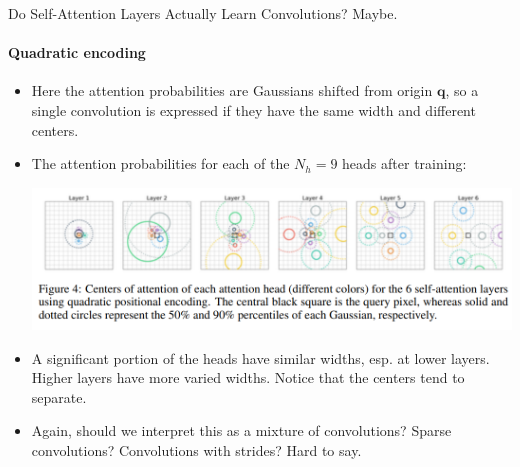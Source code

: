 \documentclass[9pt]{beamer}
\begin{document}
\begin{frame}{Do Self-Attention Layers Actually Learn Convolutions? Maybe.}
\framesubtitle{Quadratic encoding}
\begin{itemize}
\item Here the attention probabilities are Gaussians shifted from origin $\bm q$, so a single convolution is expressed if they have the same width and different centers.

\item The attention probabilities for each of the $N_h=9$ heads after training:
\begin{center}
    \includegraphics[width=.75\textwidth]{presentation/images/quad_emb_9.png}
\end{center}

\item A significant portion of the heads have similar widths, esp. at lower layers. Higher layers have more varied widths. Notice that the centers tend to separate.

\item Again, should we interpret this as a mixture of convolutions? Sparse convolutions? Convolutions with strides? Hard to say.
\end{itemize}
\end{frame}
\end{document}
